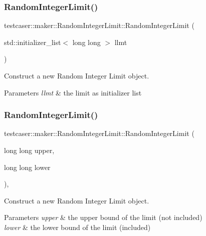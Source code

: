 \subsubsection{\texorpdfstring{Random\+Integer\+Limit()}{RandomIntegerLimit()}\hspace{0.1cm}{\footnotesize\ttfamily [1/2]}}
{\footnotesize\ttfamily testcaser\+::maker\+::\+Random\+Integer\+Limit\+::\+Random\+Integer\+Limit (\begin{DoxyParamCaption}\item[{std\+::initializer\+\_\+list$<$ long long $>$}]{llmt }\end{DoxyParamCaption})\hspace{0.3cm}{\ttfamily [inline]}}



Construct a new Random Integer Limit object. 


\begin{DoxyParams}{Parameters}
{\em llmt} & the limit as initializer list \\
\hline
\end{DoxyParams}
\mbox{\label{classtestcaser_1_1maker_1_1RandomIntegerLimit_a43781197d959fc8ab6cf54258df35a64}} 
\subsubsection{\texorpdfstring{Random\+Integer\+Limit()}{RandomIntegerLimit()}\hspace{0.1cm}{\footnotesize\ttfamily [2/2]}}
{\footnotesize\ttfamily testcaser\+::maker\+::\+Random\+Integer\+Limit\+::\+Random\+Integer\+Limit (\begin{DoxyParamCaption}\item[{long long}]{upper,  }\item[{long long}]{lower }\end{DoxyParamCaption})\hspace{0.3cm}{\ttfamily [inline]}, {\ttfamily [explicit]}}



Construct a new Random Integer Limit object. 


\begin{DoxyParams}{Parameters}
{\em upper} & the upper bound of the limit (not included) \\
\hline
{\em lower} & the lower bound of the limit (included) \\
\hline
\end{DoxyParams}


